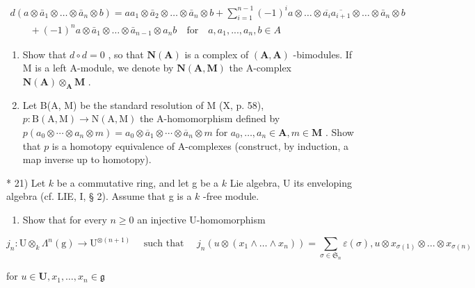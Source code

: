 \[
\begin{array}{l} d (a \otimes \bar {a} _ {1} \otimes \dots \otimes \bar {a} _ {n} \otimes b) = a a _ {1} \otimes \bar {a} _ {2} \otimes \dots \otimes \bar {a} _ {n} \otimes b + \sum_ {i = 1} ^ {n - 1} (- 1) ^ {i} a \otimes \dots \otimes \overline {{a _ {i}}} \overline {{a _ {i + 1}}} \otimes \dots \otimes \bar {a} _ {n} \otimes b \\ \qquad + (- 1) ^ {n} a \otimes \bar {a} _ {1} \otimes \dots \otimes \bar {a} _ {n - 1} \otimes a _ {n} b \quad \text {for} \quad a, a _ {1},..., a _ {n}, b \in A \end{array}
\]

\begin{enumerate}
\def\labelenumi{\alph{enumi})}
\setcounter{enumi}{1}
\item
  Show that \(d \circ d = 0\) , so that \(\mathbf{N}(\mathbf{A})\) is a complex of \((\mathbf{A}, \mathbf{A})\) -bimodules. If M is a left A-module, we denote by \(\mathbf{N}(\mathbf{A}, \mathbf{M})\) the A-complex \(\mathbf{N}(\mathbf{A}) \otimes_{\mathbf{A}} \mathbf{M}\) .
\item
  Let B(A, M) be the standard resolution of M (X, p. 58), \(p: \mathrm{B}(\mathrm{A}, \mathrm{M}) \to \mathrm{N}(\mathrm{A}, \mathrm{M})\) the A-homomorphism defined by \(p(a_0 \otimes \cdots \otimes a_n \otimes m) = a_0 \otimes \overline{a}_1 \otimes \cdots \otimes \overline{a}_n \otimes m\) for \(a_0, \ldots, a_n \in \mathbf{A}, m \in \mathbf{M}\) . Show that \(p\) is a homotopy equivalence of A-complexes (construct, by induction, a map inverse up to homotopy).
\end{enumerate}

* 21) Let \(k\) be a commutative ring, and let g be a \(k\) Lie algebra, U its enveloping algebra (cf. LIE, I, § 2). Assume that g is a \(k\) -free module.

\begin{enumerate}
\def\labelenumi{\alph{enumi})}
\tightlist
\item
  Show that for every \(n \geqslant 0\) an injective U-homomorphism
\end{enumerate}

\[
j _ {n}: \mathrm{U} \otimes_ {k} \Lambda^ {n} (\mathrm{g}) \rightarrow \mathrm{U} ^ {\otimes (n + 1)} \quad \text { such that } \quad j _ {n} (u \otimes (x _ {1} \wedge \dots \wedge x _ {n})) = \sum_ {\sigma \in \mathfrak {S} _ {n}} \varepsilon (\sigma), u \otimes x _ {\sigma (1)} \otimes \dots \otimes x _ {\sigma (n)}
\]

for \(u\in \mathbf{U},x_1,\dots ,x_n\in \mathfrak{g}\)


